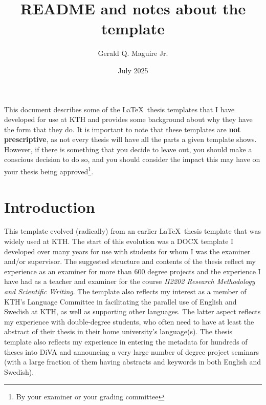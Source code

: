 \documentclass[12pt, twoside]{article}
\title{README and notes about the template}
\author{Gerald Q. Maguire Jr.}
\date{July 2025}
\newcommand*{\warningExpl}[1]{\todo[inline, backgroundcolor=kth-lightred40]{#1}} %
\begin{document}
\glsresetall[]
\maketitle
{}
\warningExpl{\textbf{This document is a work in progress.}}

This document describes some of the \LaTeX\  thesis templates that I have developed for use at \gls{KTH} and provides some background about why they have the form that they do. It is important to note that these templates are \textbf{not prescriptive}, as not every thesis will have all the parts a given template shows. However, if there is something that you decide to leave out, you should make a conscious decision to do so, and you should consider the impact this may have on your thesis being approved\footnote{By your examiner or your grading committee}.

\cleardoublepage
\renewcommand{\sectionmark}[1]{ \markboth{#1}{}}
\tableofcontents
\markboth{\contentsname}{}
\cleardoublepage
 
\section{Introduction}
This template evolved (radically) from an earlier \LaTeX\ thesis template that was widely used at \gls{KTH}. The start of this evolution was a DOCX template I developed over many years for use with students for whom I was the examiner and/or supervisor. The suggested structure and contents of the thesis reflect my experience as an examiner for more than 600 degree projects and the experience I have had as a teacher and examiner for the course \textit{II2202 Research Methodology and Scientific Writing}. The template also reflects my interest as a member of KTH's Language Committee in facilitating the parallel use of English and Swedish at \gls{KTH}, as well as supporting other languages. The latter aspect
reflects my experience with double-degree students, who often need to have at least the abstract of their thesis in their home university's language(s). The thesis template also reflects my experience in entering the metadata for hundreds of theses into \gls{DiVA} and announcing a very large number of degree project seminars (with a large fraction of them having abstracts and keywords in both English and Swedish).
\end{document}
